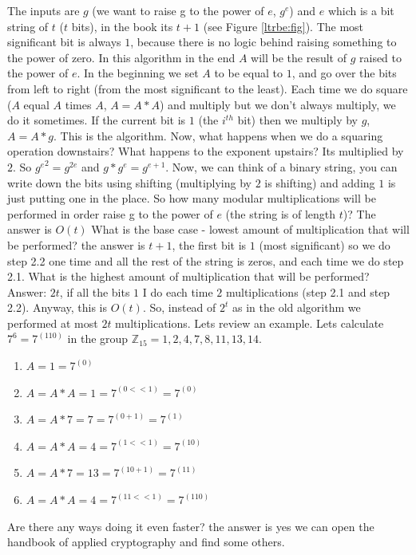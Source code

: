 The inputs are $g$ (we want to raise g to the power of $e$, \(g^e\)) and \(e\) which is a bit string of $t$ ($t$ bits), in the book its $t+1$ (see Figure \ref{ltrbe:fig}). The most significant bit is always $1$, because there is no logic behind raising something to the power of zero. In this algorithm in the end \(A\) will be the result of $g$ raised to the power of $e$. 
In the beginning we set $A$ to be equal to $1$, and go over the bits from left to right (from the most significant to the least). Each time we do square ($A$ equal $A$ times $A$, $A=A*A$) and multiply but we don’t always multiply, we do it sometimes. If the current bit is $1$ (the \( i^{th}\) bit) then we multiply by $g$, $A=A*g$. This is the algorithm. Now, what happens when we do a squaring operation downstairs? What happens to the exponent upstairs? Its multiplied by $2$. So \({g^{e}}^2 = g^{2e} \)  and  \(g*g^{e} = g^{e+1} \). Now, we can think of a binary string, you can write down the bits using shifting (multiplying by $2$ is shifting) and adding $1$ is just putting one in the place.
So how many modular multiplications will be performed in order raise g to the power of $e$ (the string is of length $t$)? The answer is \(O(t)\) What is the base case - lowest amount of multiplication that will be performed? the answer is $t+1$, the first bit is $1$ (most significant) so we do step 2.2 one time and all the rest of the string is zeros, and each time we do step 2.1. What is the  highest amount of multiplication that will be performed? Answer: $2t$, if all the bits $1$ I do each time $2$ multiplications (step 2.1 and step 2.2). Anyway, this is \(O(t)\).
So, instead of \(2^t\) as in the old algorithm we performed at most $2t$ multiplications. 
Lets review an example. Lets calculate \(7^6=7^{(110)}\) in the group \( \mathbb{Z}_{15}={1, 2, 4 ,7, 8, 11, 13, 14} \).
\begin{enumerate}
	\item  \(A = 1 = 7^(0) \)
	\item  \(A = A*A = 1 = 7^{(0<<1)} = 7^{(0)}\)
	\item  \(A = A*7 = 7 = 7^{(0+1)} = 7^{(1)}\)
	\item  \(A = A*A = 4 = 7^{(1<<1)} = 7^{(10)} \)
	\item  \(A = A*7 = 13 = 7^{(10+1)} = 7^{(11)} \)
	\item  \( A = A*A = 4 = 7^{(11<<1)} = 7^{(110)} \)
\end{enumerate}
Are there any ways doing it even faster? the answer is yes we can open the handbook of applied cryptography and find some others.
